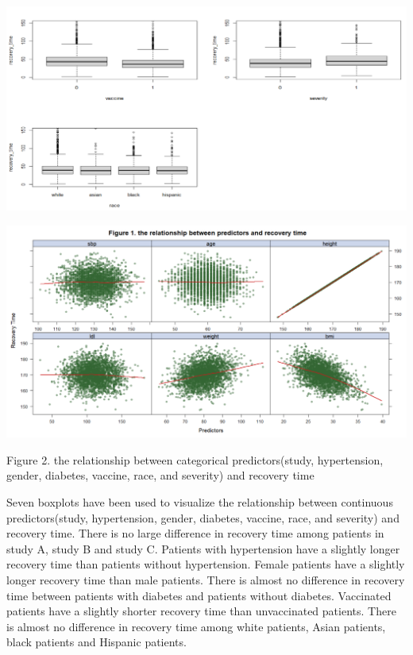 \documentclass[
]{article}
\begin{document}
\begin{center}\includegraphics[width=0.9\linewidth,height=0.7\textheight]{primary_analysis_plot/Explanatory analysis and visualization_boxplot_2} \end{center}

\begin{center}\includegraphics[width=0.9\linewidth,height=0.7\textheight]{primary_analysis_plot/Explanatory analysis and visualization_scatterplot} \end{center}
\begin{center}
Figure 2. the relationship between categorical predictors(study, hypertension, gender, diabetes, vaccine, race, and severity) and recovery time
\end{center}

Seven boxplots have been used to visualize the relationship between
continuous predictors(study, hypertension, gender, diabetes, vaccine,
race, and severity) and recovery time. There is no large difference in
recovery time among patients in study A, study B and study C. Patients
with hypertension have a slightly longer recovery time than patients
without hypertension. Female patients have a slightly longer recovery
time than male patients. There is almost no difference in recovery time
between patients with diabetes and patients without diabetes. Vaccinated
patients have a slightly shorter recovery time than unvaccinated
patients. There is almost no difference in recovery time among white
patients, Asian patients, black patients and Hispanic patients.
\end{document}
